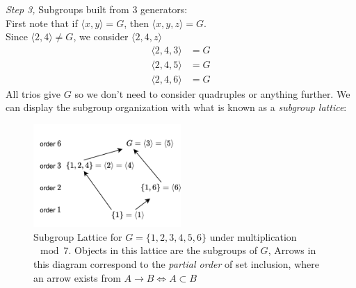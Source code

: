 \textit{Step 3,} Subgroups built from 3 generators:\\
First note that if $\langle x,y\rangle=G$, then $\langle x,y,z \rangle=G$.\\
Since $\langle 2,4\rangle\neq G$, we consider $\langle 2,4,z \rangle$
\begin{align}
    \langle 2,4,3 \rangle &=G \nonumber \\
    \langle 2,4,5 \rangle &=G \nonumber \\
    \langle 2,4,6 \rangle &=G \nonumber 
\end{align}
All trios give $G$ so we don't need to consider quadruples or anything further. We can display the subgroup organization with what is known as a \textit{subgroup lattice}:
\begin{figure}[h!]
    \centering
    \includegraphics[width=0.5\textwidth]{Figures/Subgroup Lattice example.pdf}
    \caption{Subgroup Lattice for $G=\{1,2,3,4,5,6\}$ under multiplication $\mod 7$. Objects in this lattice are the subgroups of $G$, Arrows in this diagram correspond to the \textit{partial order} of set inclusion, where an arrow exists from $A\rightarrow B \iff A\subset B$}
    \label{fig:Subgroup_lattice}
\end{figure}
\newpage
